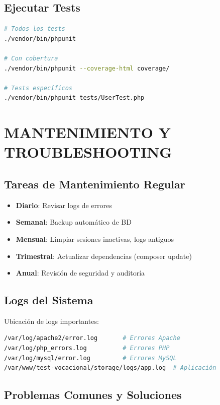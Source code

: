 \documentclass[12pt, a4paper]{report}
\begin{document}
\section{Ejecutar Tests}
\begin{lstlisting}[language=Bash]
# Todos los tests
./vendor/bin/phpunit

# Con cobertura
./vendor/bin/phpunit --coverage-html coverage/

# Tests específicos
./vendor/bin/phpunit tests/UserTest.php
\end{lstlisting}

\chapter{MANTENIMIENTO Y TROUBLESHOOTING}

\section{Tareas de Mantenimiento Regular}
\begin{itemize}
    \item \textbf{Diario}: Revisar logs de errores
    \item \textbf{Semanal}: Backup automático de BD
    \item \textbf{Mensual}: Limpiar sesiones inactivas, logs antiguos
    \item \textbf{Trimestral}: Actualizar dependencias (composer update)
    \item \textbf{Anual}: Revisión de seguridad y auditoría
\end{itemize}

\section{Logs del Sistema}
Ubicación de logs importantes:
\begin{lstlisting}[language=Bash]
/var/log/apache2/error.log       # Errores Apache
/var/log/php_errors.log          # Errores PHP
/var/log/mysql/error.log         # Errores MySQL
/var/www/test-vocacional/storage/logs/app.log  # Aplicación
\end{lstlisting}

\section{Problemas Comunes y Soluciones}
\end{document}
